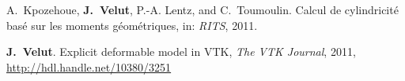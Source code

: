 %
\renewcommand{\refname}{\normalsize{Conf\'erences nationales avec
		    comit\'e de lecture }}
\vspace{-10pt}
\begin{thebibliography}{1}
\setlength{\itemsep}{\myitemsep}
%
A.~Kpozehoue, \textbf{J.~Velut}, P.-A. Lentz, and C.~Toumoulin.
\newblock Calcul de cylindricit\'e
  bas\'e sur les moments g\'eom\'etriques, 
\newblock in: \emph{RITS}, 2011.
\end{thebibliography}
%
\renewcommand{\refname}{\normalsize{Publications en ligne }}
\vspace{-10pt}
\begin{thebibliography}{1}
\setlength{\itemsep}{\myitemsep}
%
\textbf{J.~Velut}.
\newblock Explicit deformable model in VTK,
\newblock \emph{The VTK Journal}, 2011, \url{http://hdl.handle.net/10380/3251}
\end{thebibliography}
%